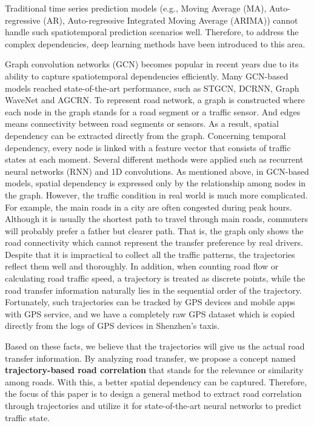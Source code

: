 Traditional time series prediction models (e.g., Moving Average (MA), Auto-regressive (AR), Auto-regressive Integrated Moving Average (ARIMA)) cannot handle such spatiotemporal prediction scenarios well. Therefore, to address the complex dependencies, deep learning methods have been introduced to this area.

Graph convolution networks (GCN)\cite{GCN0} becomes popular in recent years due to its ability to capture spatiotemporal dependencies efficiently. Many GCN-based models reached state-of-the-art performance, such as STGCN\cite{STGCN}, DCRNN\cite{DCRNN}, Graph WaveNet\cite{GWNET} and AGCRN\cite{AGCRN}. To represent road network, a graph is constructed where each node in the graph stands for a road segment or a traffic sensor. And edges means connectivity between road segments or sensors. As a result, spatial dependency can be extracted directly from the graph. Concerning temporal dependency, every node is linked with a feature vector that consists of traffic states at each moment. Several different methods were applied such as recurrent neural networks (RNN) and 1D convolutions. As mentioned above, in GCN-based models, spatial dependency is expressed only by the relationship among nodes in the graph. However, the traffic condition in real world is much more complicated. For example, the main roads in a city are often congested during peak hours. Although it is usually the shortest path to travel through main roads, commuters will probably prefer a father but clearer path. That is, the graph only shows the road connectivity which cannot represent the transfer preference by real drivers. Despite that it is impractical to collect all the traffic patterns, the trajectories reflect them well and thoroughly. In addition, when counting road flow or calculating road traffic speed, a trajectory is treated as discrete points, while the road transfer information naturally lies in the sequential order of the trajectory. Fortunately, such trajectories can be tracked by GPS devices and mobile apps with GPS service, and we have a completely raw GPS dataset which is copied directly from the logs of GPS devices in Shenzhen's taxis.

Based on these facts, we believe that the trajectories will give us the actual road transfer information. By analyzing road transfer, we propose a concept named \textbf{trajectory-based road correlation} that stands for the relevance or similarity among roads. With this, a better spatial dependency can be captured. Therefore, the focus of this paper is to design a general method to extract road correlation through trajectories and utilize it for state-of-the-art neural networks to predict traffic state.

